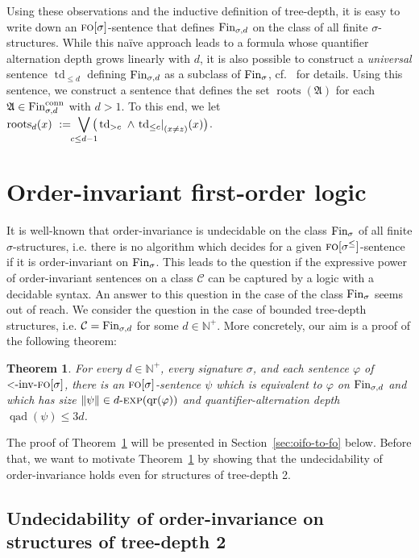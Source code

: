 \documentclass[11pt]{article}
\newtheorem{theorem}{Theorem}
\renewcommand{\phi}{\varphi}
\newcommand{\fin}{\textup{Fin}}
\newcommand{\conn}{\text{conn}}
\newcommand{\logic}[1]{\textsc{#1}}
\newcommand{\FO}{\logic{fo}}
\newcommand{\ordinv}[1]{\textnormal{{\small \textless}-inv-}#1}
\newcommand{\oiFO}{\ordinv{\FO{}}}
\newcommand{\size}[1]{\|#1\|}
\newcommand{\qr}[1]{\operatorname{qr}(#1)}
\newcommand{\qad}[1]{\operatorname{qad}(#1)}
\newcommand{\biglor}{\bigvee}
\newcommand{\rela}[2]{\ensuremath{{#1|}_{#2}}}
\newcommand{\class}[1]{\mathcal{#1}}
\newcommand{\struct}[1]{\mathfrak{#1}}
\newcommand{\AS}{\struct{A}}
\newcommand{\td}{\operatorname{td}}
\DeclareMathOperator{\tdroot}{roots}
\newcommand{\Npos}{\mathbb{N}^{+}}
\newcommand{\nexp}[1][d]{\ensuremath{#1\textnormal{-}\textsc{exp}}}
\begin{document}
Using these observations and the inductive definition of tree-depth,
it is easy to write down an $\FO[\sigma]$-sentence that defines
$\fin_{\sigma,d}$ on the class of all finite
$\sigma$-structures. While this na\"ive approach leads to a formula
whose quantifier alternation depth grows linearly with $d$, it is also
possible to construct a \emph{universal} sentence $\td_{\leq d}$
defining $\fin_{\sigma,d}$ as a subclass of $\fin_{\sigma}$,
cf.~\cite[Section~6.10]{NesetrilMendez2012} for details.
Using this sentence, we construct a sentence that defines the set $\tdroot(\AS)$ for each $\AS\in \fin^\conn_{\sigma,d}$ with $d>1$. To this end, we let $\tdroot_d(x)\ :=\ \smashoperator{\biglor_{c \leq d-1}} \big( \td_{> c} \ \land \ \rela{{\td_{\leq c}}}{(x \neq z)}(x) \big)$. 

\section{Order-invariant first-order logic}
\label{sec:oifo}

It is well-known that order-invariance is undecidable on the class $\fin_\sigma$
of all finite $\sigma$-structures, i.e.  there is no algorithm which decides for
a given $\FO[\sigma^{\leq}]$-sentence if it is order-invariant on
$\fin_\sigma$. This leads to the question if the expressive power of
order-invariant sentences on a class $\class{C}$ can be captured by a logic with
a decidable syntax.  An answer to this question in the case of the class
$\fin_\sigma$ seems out of reach.  We consider the question in the case of
bounded tree-depth structures, i.e. $\class{C}=\fin_{\sigma,d}$ for some $d\in
\Npos$.  More concretely, our aim is a proof of the following theorem:

\begin{theorem}
  \label{thm:oifo-eq-fo}
  For every $d\in \Npos$, every signature $\sigma$, and each sentence
  $\phi$ of $\oiFO[\sigma]$, there is an $\FO[\sigma]$-sentence $\psi$
  which is equivalent to $\phi$ on $\fin_{\sigma,d}$ and which has
  size $\size{\psi}\in \nexp[d](\qr{\phi})$ and quantifier-alternation
  depth $\qad{\psi} \leq 3d$.
\end{theorem}

The proof of Theorem~\ref{thm:oifo-eq-fo} will be presented in
Section~\ref{sec:oifo-to-fo} below. Before that, we want to motivate
Theorem~\ref{thm:oifo-eq-fo} by showing that the undecidability of
order-invariance holds even for structures of tree-depth 2.

\subsection{Undecidability of order-invariance on structures of tree-depth 2}
\label{sec:undecidability}
\end{document}
